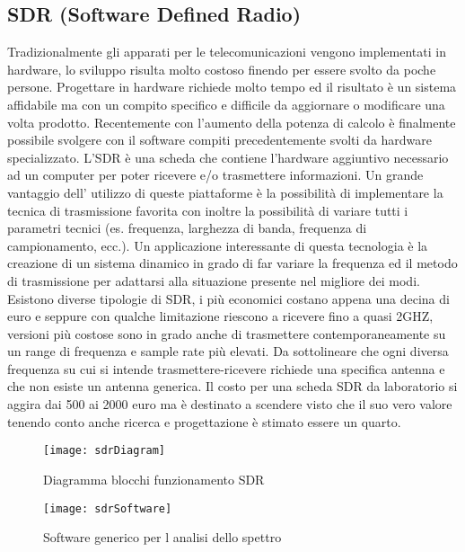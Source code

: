 \begin{itemize}
\chapter{SDR (Software Defined Radio)} Tradizionalmente gli apparati per le telecomunicazioni vengono implementati in hardware, lo sviluppo risulta molto costoso finendo per essere svolto da poche persone. Progettare in hardware richiede molto tempo ed il risultato è un sistema affidabile ma con un compito specifico e difficile da aggiornare o modificare una volta prodotto. Recentemente con l'aumento della potenza di calcolo è finalmente possibile svolgere con il software compiti precedentemente svolti da hardware specializzato. L'SDR è una scheda che contiene l'hardware aggiuntivo necessario ad un computer per poter ricevere e/o trasmettere informazioni. Un grande vantaggio dell' utilizzo di queste piattaforme è la possibilità di implementare la tecnica di trasmissione favorita con inoltre la possibilità di variare tutti i parametri tecnici (es. frequenza, larghezza di banda, frequenza di campionamento, ecc.). Un applicazione interessante di questa tecnologia è la creazione di un sistema dinamico in grado di far variare la frequenza ed il metodo di trasmissione per adattarsi alla situazione presente nel migliore dei modi. Esistono diverse tipologie di SDR, i più economici costano appena una decina di euro e seppure con qualche limitazione riescono a ricevere fino a quasi 2GHZ, versioni più costose sono in grado anche di trasmettere contemporaneamente su un range di frequenza e sample rate più elevati. Da sottolineare che ogni diversa frequenza su cui si intende trasmettere-ricevere richiede una specifica antenna e che non esiste un antenna generica.
Il costo per una scheda SDR da laboratorio si aggira dai 500 ai 2000 euro ma è destinato a scendere visto che il suo vero valore tenendo conto anche ricerca e progettazione è stimato essere un quarto. \cite{SdrDrugs}
\begin{figure}[h]
	\centering
	\begin{minipage}[b]{.5\columnwidth}
		\texttt{[image: sdrDiagram]}
		\caption{Diagramma blocchi funzionamento SDR \cite{sdrDiagram}}\label{fig:1}
	\end{minipage}\hfill
	\begin{minipage}[b]{.4\columnwidth}
		\texttt{[image: sdrSoftware]}
		\caption{Software generico per l analisi dello spettro \cite{sdrSoftware}}\label{fig:1}
	\end{minipage}\hfill
\end{figure}

\end{itemize}
